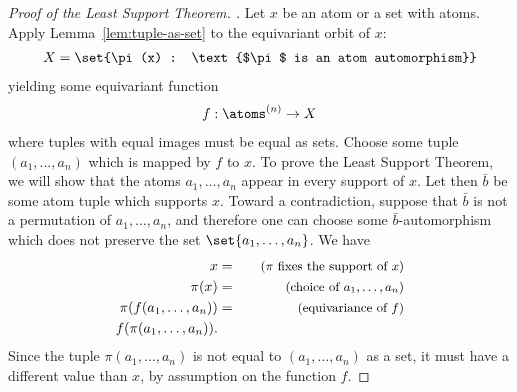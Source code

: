 \begin{proof}[Proof of the Least Support Theorem. ]
 Let $x$ be an atom or a set with atoms. Apply Lemma~\ref{lem:tuple-as-set} to the equivariant orbit of $x$:
\begin{align*}
 X = \set{\pi(x) : \text{$\pi$ is an atom automorphism}}
\end{align*}
yielding some equivariant function
\begin{align*}
 f : \atoms^{(n)} \to X
\end{align*}
where tuples with equal images must be equal as sets. 
Choose some tuple $(a_1,\ldots,a_n)$ which is mapped by $f$ to $x$. To prove the Least Support Theorem, we will show that the atoms $a_1,\ldots,a_n$ appear in every support of $x$. Let then $\bar b$ be some atom tuple which supports $x$. Toward a contradiction, suppose that $\bar b$ is not a permutation of $a_1,\ldots,a_n$, and therefore one can choose some $\bar b$-automorphism which does not preserve the set $\set{a_1,\ldots,a_n}$. We have 
\begin{eqnarray*}
 x &=\quad & \text{\small($\pi$ fixes the support of $x$)}\\ 
 \pi(x) &=\quad & \text{\small(choice of $a_1,\ldots,a_n$)}\\ 
 \pi(f(a_1,\ldots,a_n)) &=\quad & \text{\small(equivariance of $f$)}\\
 f(\pi(a_1,\ldots,a_n)).
\end{eqnarray*}
Since the tuple $\pi(a_1,\ldots,a_n)$ is not equal to $(a_1,\ldots,a_n)$ as a set, it must have a different value than $x$, by assumption on the function $f$. 
\end{proof}



